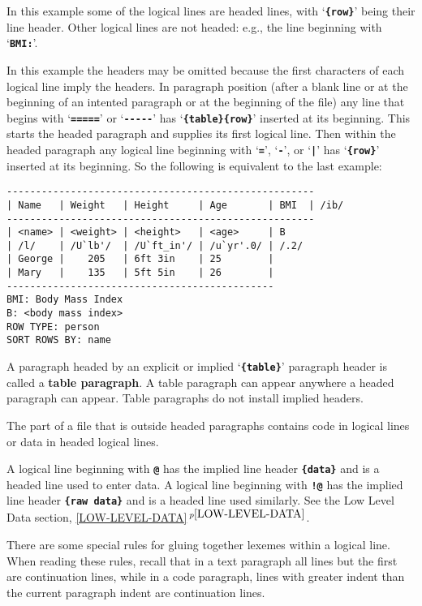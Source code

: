 \documentclass[12pt]{article}
\newcommand{\TT}[1]{{\tt \bfseries #1}}
\newcommand{\key}[1]{{\rm \bfseries #1}}
\newcommand{\itemref}[1]{\ref{#1}$\,^{p\pageref{#1}}$}
\newenvironment{indpar}[1][0.3in]%
	{\begin{list}{}%
		     {\setlength{\itemsep}{0in}%
		      \setlength{\topsep}{0in}%
		      \setlength{\parsep}{1ex}%
		      \setlength{\labelwidth}{#1}%
		      \setlength{\leftmargin}{#1}%
		      \addtolength{\leftmargin}{\labelsep}}%
	 \item}%
	{\end{list}}
\begin{document}
In this example some of the logical lines are headed lines,
with `\TT{\{row\}}' being their line header.
Other logical lines are not headed: e.g., the line beginning
with `\TT{BMI:}'.

In this example the headers may be omitted because
the first characters of each logical line imply the headers.
In paragraph position (after a blank line or at the beginning
of an intented paragraph or at the beginning of the file)
any line that begins with `\TT{=====}' or `\TT{-{}-{}-{}-{}-}'
has `\TT{\{table\}\{row\}}' inserted at its beginning.  This
starts the headed paragraph and supplies its first logical
line.  Then within the headed paragraph any logical line
beginning with `\TT{=}', `\TT{-}', or `\TT{|}' has
`\TT{\{row\}}' inserted at its beginning.  So the following
is equivalent to the last example:
\begin{indpar}\begin{verbatim}
-----------------------------------------------------
| Name   | Weight   | Height     | Age       | BMI  | /ib/
-----------------------------------------------------
| <name> | <weight> | <height>   | <age>     | B
| /l/    | /U`lb'/  | /U`ft_in'/ | /u`yr'.0/ | /.2/
| George |    205   | 6ft 3in    | 25        |
| Mary   |    135   | 5ft 5in    | 26        |
----------------------------------------------
BMI: Body Mass Index
B: <body mass index>
ROW TYPE: person
SORT ROWS BY: name
\end{verbatim}\end{indpar}

A paragraph headed by an explicit or implied 
`\TT{\{table\}}' paragraph header is called a \key{table paragraph}.
A table paragraph can appear anywhere a headed paragraph can appear.
Table paragraphs do not install implied headers.

The part of a file that is outside headed paragraphs contains code in
logical lines or data in headed logical lines.

A logical line beginning with \TT{@}\label{DATA-ENTRY-LINE}
has the implied line header
\TT{\{data\}} and is a headed line used to enter data.
A logical line beginning with \TT{!@} has the implied line header
\TT{\{raw data\}} and is a headed line used similarly.
See the Low Level Data section, \itemref{LOW-LEVEL-DATA}.

There are some special rules for gluing together lexemes within
a logical line.  When reading these rules, recall that in a text
paragraph all lines but the first are continuation lines, while
in a code paragraph, lines with greater indent than the current paragraph
indent are continuation lines.
\end{document}
